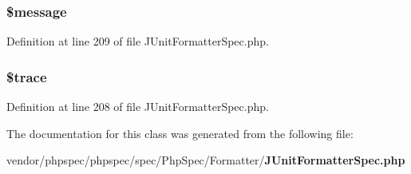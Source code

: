 \subsubsection[{\$message}]{\setlength{\rightskip}{0pt plus 5cm}\$message\hspace{0.3cm}{\ttfamily [protected]}}\label{classspec_1_1_php_spec_1_1_formatter_1_1_exception_stub_abf17cb2dba2ed17cb28aa5f37deb5293}


Definition at line 209 of file J\+Unit\+Formatter\+Spec.\+php.

\subsubsection[{\$trace}]{\setlength{\rightskip}{0pt plus 5cm}\$trace\hspace{0.3cm}{\ttfamily [protected]}}\label{classspec_1_1_php_spec_1_1_formatter_1_1_exception_stub_a6983ad0ef833074b1af98e16d68ff4db}


Definition at line 208 of file J\+Unit\+Formatter\+Spec.\+php.



The documentation for this class was generated from the following file\+:\begin{DoxyCompactItemize}
\item 
vendor/phpspec/phpspec/spec/\+Php\+Spec/\+Formatter/{\bf J\+Unit\+Formatter\+Spec.\+php}\end{DoxyCompactItemize}
